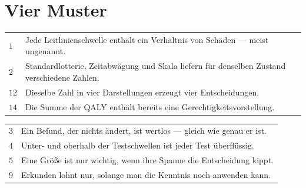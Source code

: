\section{Vier Muster}

\begin{merksatz}
\begin{center}
{\small
\renewcommand{\arraystretch}{1.48}
\begin{tabular}{@{}P{1.4cm}P{7.0cm}@{}}
\toprule
$1$ & Jede Leitlinienschwelle enthält ein Verhältnis von Schäden --- meist ungenannt.\\
$2$ & Standardlotterie, Zeitabwägung und Skala liefern für denselben Zustand verschiedene Zahlen.\\
$12$ & Dieselbe Zahl in vier Darstellungen erzeugt vier Entscheidungen.\\
$14$ & Die Summe der QALY enthält bereits eine Gerechtigkeitsvorstellung.\\
\bottomrule
\end{tabular}}
\end{center}

\begin{center}
\begin{minipage}{0.88\textwidth}
\end{minipage}
\end{center}
\end{merksatz}

\begin{merksatz}
\begin{center}
{\small
\renewcommand{\arraystretch}{1.48}
\begin{tabular}{@{}P{1.4cm}P{7.0cm}@{}}
\toprule
$3$ & Ein Befund, der nichts ändert, ist wertlos --- gleich wie genau er ist.\\
$4$ & Unter- und oberhalb der Testschwellen ist jeder Test überflüssig.\\
$5$ & Eine Größe ist nur wichtig, wenn ihre Spanne die Entscheidung kippt.\\
$9$ & Erkunden lohnt nur, solange man die Kenntnis noch anwenden kann.\\
\bottomrule
\end{tabular}}
\end{center}

\begin{center}
\begin{minipage}{0.88\textwidth}
\end{minipage}
\end{center}
\end{merksatz}

